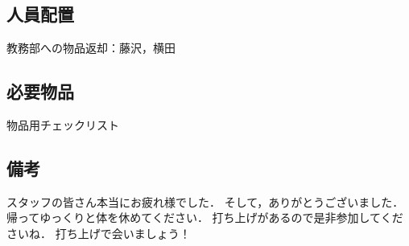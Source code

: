 \subsection{人員配置}
教務部への物品返却：藤沢，横田

\subsection{必要物品}
物品用チェックリスト


\subsection{備考}
スタッフの皆さん本当にお疲れ様でした．
そして，ありがとうございました．
帰ってゆっくりと体を休めてください．
打ち上げがあるので是非参加してくださいね．
打ち上げで会いましょう！

%

